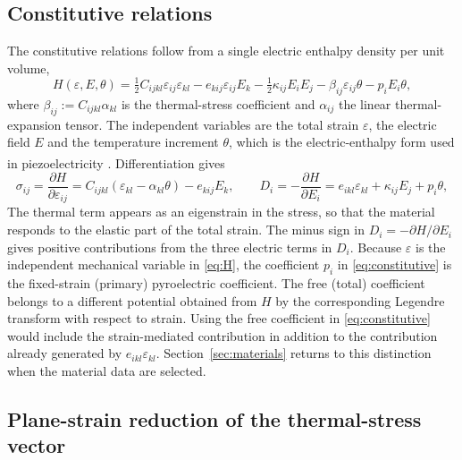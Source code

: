 \documentclass[a4paper, 11pt, twoside]{article}
\newcommand{\supercite}[1]{\!\!\textsuperscript{\cite{#1}}}
\begin{document}
\subsection{Constitutive relations}

The constitutive relations follow from a single electric enthalpy density per unit
volume,
\begin{equation}
H(\varepsilon,E,\theta)=\tfrac12 C_{ijkl}\varepsilon_{ij}\varepsilon_{kl}
-e_{kij}\varepsilon_{ij}E_k-\tfrac12\kappa_{ij}E_iE_j-\beta_{ij}\varepsilon_{ij}\theta
-p_iE_i\theta,
\label{eq:H}
\end{equation}
where $\beta_{ij}:=C_{ijkl}\alpha_{kl}$ is the thermal-stress coefficient and
$\alpha_{ij}$ the linear thermal-expansion tensor. The independent variables are the
total strain $\varepsilon$, the electric field $E$ and the temperature increment
$\theta$, which is the electric-enthalpy form used in piezoelectricity
\supercite{Tiersten1969b,Yang2005b}. Differentiation gives
\begin{equation}
\sigma_{ij}=\frac{\partial H}{\partial\varepsilon_{ij}}
=C_{ijkl}(\varepsilon_{kl}-\alpha_{kl}\theta)-e_{kij}E_k,
\qquad
D_i=-\frac{\partial H}{\partial E_i}
=e_{ikl}\varepsilon_{kl}+\kappa_{ij}E_j+p_i\theta,
\label{eq:constitutive}
\end{equation}
The thermal term appears as an eigenstrain in the stress, so that the material responds
to the elastic part of the total strain. The minus sign in
$D_i=-\partial H/\partial E_i$ gives positive contributions from the three electric
terms in $D_i$. Because $\varepsilon$ is the independent mechanical variable in
\eqref{eq:H}, the coefficient $p_i$ in \eqref{eq:constitutive} is the fixed-strain
(primary) pyroelectric coefficient. The free (total) coefficient belongs to a different
potential obtained from $H$ by the corresponding Legendre transform with respect to
strain. Using the free coefficient in \eqref{eq:constitutive} would include the
strain-mediated contribution in addition to the contribution already generated by
$e_{ikl}\varepsilon_{kl}$. Section~\ref{sec:materials} returns to this distinction when
the material data are selected.

\subsection{Plane-strain reduction of the thermal-stress vector}
\label{sec:planestrain}
\end{document}
